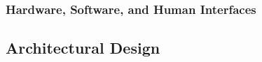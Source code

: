 \documentclass{article}
\begin{document}
\subsubsection{Hardware, Software, and Human Interfaces}


\pagebreak
\subsection{Architectural Design}


\end{document}
